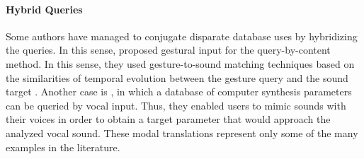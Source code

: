 {	\paragraph{Hybrid Queries}
	Some authors have managed to conjugate disparate database uses by hybridizing the queries. In this sense, \cite{Caramiaux2011} proposed gestural input for the query-by-content method. In this sense, they used gesture-to-sound matching techniques based on the similarities of temporal evolution between the gesture query and the sound target . Another case is \cite{mcartwright:2014}, in which a database of computer synthesis parameters can be queried by vocal input. Thus, they enabled users to mimic sounds with their voices in order to obtain a target parameter that would approach the analyzed vocal sound. These modal translations represent only some of the many examples in the literature.
}
